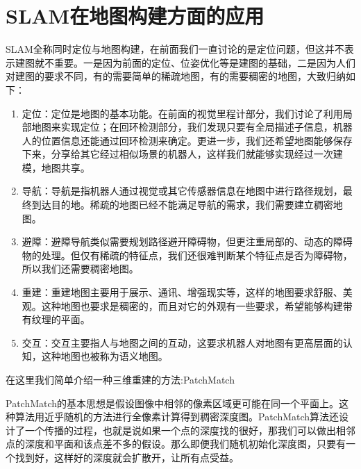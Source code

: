 \chapter{SLAM在地图构建方面的应用}
SLAM全称同时定位与地图构建，在前面我们一直讨论的是定位问题，但这并不表示建图就不重要。一是因为前面的定位、位姿优化等是建图的基础，二是因为人们对建图的要求不同，有的需要简单的稀疏地图，有的需要稠密的地图，大致归纳如下：\par
\begin{enumerate}
	\item 定位：定位是地图的基本功能。在前面的视觉里程计部分，我们讨论了利用局部地图来实现定位；在回环检测部分，我们发现只要有全局描述子信息，机器人的位置信息还能通过回环检测来确定。更进一步，我们还希望地图能够保存下来，分享给其它经过相似场景的机器人，这样我们就能够实现经过一次建模，地图共享。
	\item 导航：导航是指机器人通过视觉或其它传感器信息在地图中进行路径规划，最终到达目的地。稀疏的地图已经不能满足导航的需求，我们需要建立稠密地图。
	\item 避障：避障导航类似需要规划路径避开障碍物，但更注重局部的、动态的障碍物的处理。但仅有稀疏的特征点，我们还很难判断某个特征点是否为障碍物， 所以我们还需要稠密地图。
	\item 重建：重建地图主要用于展示、通讯、增强现实等，这样的地图要求舒服、美观。这种地图也要求是稠密的，而且对它的外观有一些要求，希望能够构建带有纹理的平面。
	\item 交互：交互主要指人与地图之间的互动，这要求机器人对地图有更高层面的认知，这种地图也被称为语义地图。
\end{enumerate}
在这里我们简单介绍一种三维重建的方法:PatchMatch\par
PatchMatch的基本思想是假设图像中相邻的像素区域更可能在同一个平面上。这种算法用近乎随机的方法进行全像素计算得到稠密深度图。PatchMatch算法还设计了一个传播的过程，也就是说如果一个点的深度找的很好，那我们可以做出相邻点的深度和平面和该点差不多的假设。那么即便我们随机初始化深度图，只要有一个找到好，这样好的深度就会扩散开，让所有点受益。
